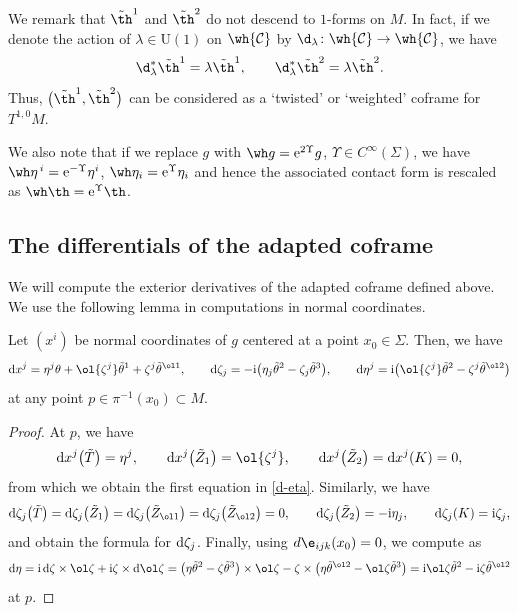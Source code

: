 We remark that $\tilde\th^1$ and $\tilde\th^2$ do not descend to $1$-forms on $M$. In fact, if we denote the action of $\lambda\in \mathrm{U}(1)$ on $\wh{\mathcal{C}}$ by $\d_\lambda\colon \wh{\mathcal{C}}\to \wh{\mathcal{C}}$, we have
\[
\d_\lambda^* \tilde\th^1=\lambda \tilde\th^1, \qquad \d_\lambda^*\tilde\th^2=\lambda\tilde\th^2.
\]
Thus, $\bigl(\tilde\th^1, \tilde\th^2\bigr)$ can be considered as a `twisted' or `weighted' coframe for $T^{1, 0}M$.

We also note that if we replace $g$ with $\wh g={\rm e}^{2\Upsilon} g$, $\Upsilon\in C^\infty(\Sigma)$, we have $\wh\eta^{\,i}={\rm e}^{-\Upsilon}\eta^i$, $\wh\eta_i={\rm e}^{\Upsilon}\eta_i$ and hence the associated contact form is rescaled as $\wh\th={\rm e}^{\Upsilon}\th$.


\subsection{The differentials of the adapted coframe}
We will compute the exterior derivatives of the adapted coframe defined above.
We use the following lemma in computations in normal coordinates.
\begin{Lemma}
Let $(x^i)$ be normal coordinates of $g$ centered at a point $x_0\in\Sigma$. Then, we have
\begin{equation}\label{d-eta}
{\rm d}x^j=\eta^j\theta+\ol{\zeta^j}\tilde\theta^1+\zeta^j\tilde\theta^{\ol1}, \qquad
{\rm d}\zeta_j=-{\rm i}\bigl(\eta_j\tilde\theta^2-\zeta_j\tilde\theta^3\bigr), \qquad
{\rm d}\eta^j={\rm i}\bigl(\ol{\zeta^j}\tilde\theta^2-\zeta^j\tilde\theta^{\ol2}\bigr)
\end{equation}
at any point $p\in \pi^{-1}(x_0)\subset M$.
\end{Lemma}
\begin{proof}
At $p$, we have
\[
{\rm d}x^j\bigl(\tilde T\bigr)=\eta^j, \qquad {\rm d}x^j\bigl(\tilde Z_1\bigr)=\ol{\zeta^j},\qquad {\rm d}x^j\bigl(\tilde Z_2\bigr)={\rm d}x^j(K)=0,
\]
from which we obtain the first equation in \eqref{d-eta}. Similarly, we have
\[
{\rm d}\zeta_j\bigl(\tilde T\bigr)={\rm d}\zeta_j\bigl(\tilde Z_{1}\bigr)={\rm d}\zeta_j\bigl(\tilde Z_{\ol1}\bigr)={\rm d}\zeta_j\bigl(\tilde Z_{\ol2}\bigr)=0, \qquad
{\rm d}\zeta_j\bigl(\tilde Z_2\bigr)=-{\rm i}\eta_j, \qquad
{\rm d}\zeta_j(K)={\rm i}\zeta_j,
\]
and obtain the formula for ${\rm d}\zeta_j$. Finally, using $d\e_{ijk}(x_0)=0$, we compute as
 \[
{\rm d}\eta={\rm i}\,{\rm d}\zeta\times \ol\zeta+{\rm i}\zeta\times {\rm d}\ol\zeta
=\bigl(\eta\tilde\theta^2-\zeta\tilde\theta^3\bigr)\times\ol\zeta-\zeta\times\bigl(\eta\tilde\theta^{\ol2}-\ol\zeta\tilde\theta^3\bigr)={\rm i}\ol\zeta\tilde\theta^2-{\rm i}\zeta\tilde\theta^{\ol2}
\]
at $p$.
\end{proof}

